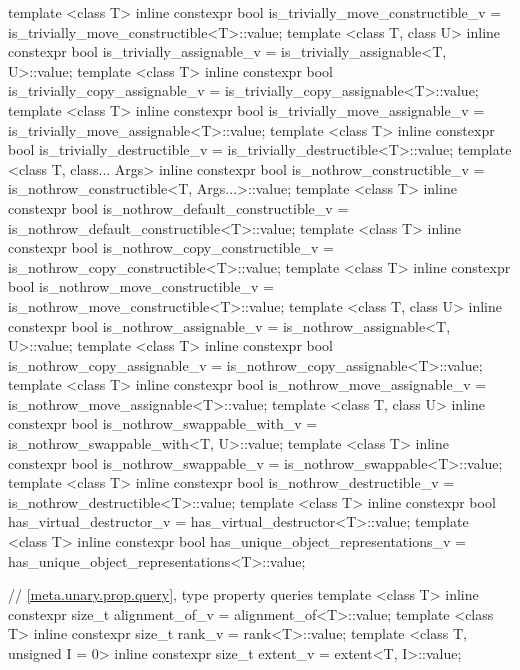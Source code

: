 \begin{codeblock}
{  template <class T> inline constexpr bool is_trivially_move_constructible_v
    = is_trivially_move_constructible<T>::value;
  template <class T, class U> inline constexpr bool is_trivially_assignable_v
    = is_trivially_assignable<T, U>::value;
  template <class T> inline constexpr bool is_trivially_copy_assignable_v
    = is_trivially_copy_assignable<T>::value;
  template <class T> inline constexpr bool is_trivially_move_assignable_v
    = is_trivially_move_assignable<T>::value;
  template <class T> inline constexpr bool is_trivially_destructible_v
    = is_trivially_destructible<T>::value;
  template <class T, class... Args> inline constexpr bool is_nothrow_constructible_v
    = is_nothrow_constructible<T, Args...>::value;
  template <class T> inline constexpr bool is_nothrow_default_constructible_v
    = is_nothrow_default_constructible<T>::value;
  template <class T> inline constexpr bool is_nothrow_copy_constructible_v
    = is_nothrow_copy_constructible<T>::value;
  template <class T> inline constexpr bool is_nothrow_move_constructible_v
    = is_nothrow_move_constructible<T>::value;
  template <class T, class U> inline constexpr bool is_nothrow_assignable_v
    = is_nothrow_assignable<T, U>::value;
  template <class T> inline constexpr bool is_nothrow_copy_assignable_v
    = is_nothrow_copy_assignable<T>::value;
  template <class T> inline constexpr bool is_nothrow_move_assignable_v
    = is_nothrow_move_assignable<T>::value;
  template <class T, class U> inline constexpr bool is_nothrow_swappable_with_v
    = is_nothrow_swappable_with<T, U>::value;
  template <class T> inline constexpr bool is_nothrow_swappable_v
    = is_nothrow_swappable<T>::value;
  template <class T> inline constexpr bool is_nothrow_destructible_v
    = is_nothrow_destructible<T>::value;
  template <class T> inline constexpr bool has_virtual_destructor_v
    = has_virtual_destructor<T>::value;
  template <class T> inline constexpr bool has_unique_object_representations_v
    = has_unique_object_representations<T>::value;

  // \ref{meta.unary.prop.query}, type property queries
  template <class T> inline constexpr size_t alignment_of_v
    = alignment_of<T>::value;
  template <class T> inline constexpr size_t rank_v
    = rank<T>::value;
  template <class T, unsigned I = 0> inline constexpr size_t extent_v
    = extent<T, I>::value;

}
\end{codeblock}
